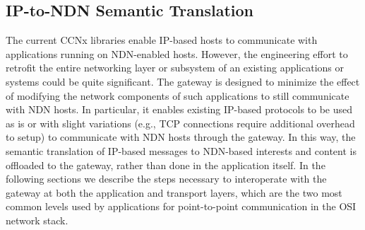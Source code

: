 \subsection{IP-to-NDN Semantic Translation}
The current CCNx libraries enable IP-based hosts to communicate with applications running on NDN-enabled hosts. However, the engineering effort to retrofit the entire networking layer or subsystem of an existing applications or systems could be quite significant. The gateway is designed to minimize the effect of modifying the network components of such applications to still communicate with NDN hosts. In particular, it enables existing IP-based protocols to be used as is or with slight variations (e.g., TCP connections require additional overhead to setup) to communicate with NDN hosts through the gateway. In this way, the semantic translation of IP-based messages to NDN-based interests and content is offloaded to the gateway, rather than done in the application itself. In the following sections we describe the steps necessary to interoperate with the gateway at both the application and transport layers, which are the two most common levels used by applications for point-to-point communication in the OSI network stack.


